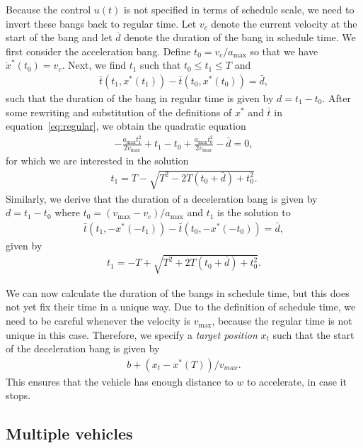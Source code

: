 \documentclass[a4paper]{article}
\theoremstyle{definition}
\theoremstyle{plain}
\begin{document}
Because the control $u(t)$ is not specified in terms of schedule scale, we need
to invert these bangs back to regular time.
%
Let $v_{c}$ denote the current velocity at the start of the bang and let
$\bar{d}$ denote the duration of the bang in schedule time. We first consider
the acceleration bang. Define $t_{0}= v_{c} / a_{\max}$ so that we have
$\dot{x}^{*}(t_{0}) = v_{c}$. Next, we find $t_{1}$ such that
$t_{0} \leq t_{1} \leq T$ and
\begin{align}
  \label{eq:regular}
   \bar{t}(t_{1}, x^{*}(t_{1})) - \bar{t}(t_{0}, x^{*}(t_{0})) = \bar{d} ,
\end{align}
such that the duration of the bang in regular time is given by $d = t_{1} - t_{0}$.
%
After some rewriting and substitution of the definitions of $x^{*}$ and
$\bar{t}$ in equation~\eqref{eq:regular}, we obtain the quadratic equation
\begin{align*}
  - \frac{a_{\max} t_{1}^{2}}{2 v_{\max}} + t_{1} - t_{0} + \frac{a_{\max} t_{0}^{2}}{2 v_{\max}} - \bar{d} = 0 ,
\end{align*}
for which we are interested in the solution
\begin{align*}
  t_{1} = T - \sqrt{T^{2} - 2T(t_{0} + \bar{d}) +t_{0}^{2}} .
\end{align*}
%
Similarly, we derive that the duration of a deceleration bang is given by
$d = t_{1} - t_{0}$ where $t_{0} = (v_{\max} - v_{c}) / a_{\max}$ and $t_{1}$ is
the solution to
\begin{align*}
  \bar{t}(t_{1}, -x^{*}(-t_{1})) - \bar{t}(t_{0}, -x^{*}(-t_{0})) = \bar{d} ,
\end{align*}
given by
\begin{align*}
  t_{1} = - T + \sqrt{T^{2} +2T(t_{0} + \bar{d}) + t_{0}^{2}} .
\end{align*}

We can now calculate the duration of the bangs in schedule time, but this does
not yet fix their time in a unique way. Due to the definition of schedule time,
we need to be careful whenever the velocity is $v_{\max}$, because the regular
time is not unique in this case. Therefore, we specify a \textit{target
  position} $x_{t}$ such that the start of the deceleration bang is given by
\begin{align*}
  b + (x_{t} - x^{*}(T)) / v_{max} .
\end{align*}
This ensures that the vehicle has enough distance to $w$ to accelerate, in case
it stops.


\subsection{Multiple vehicles}
\end{document}
